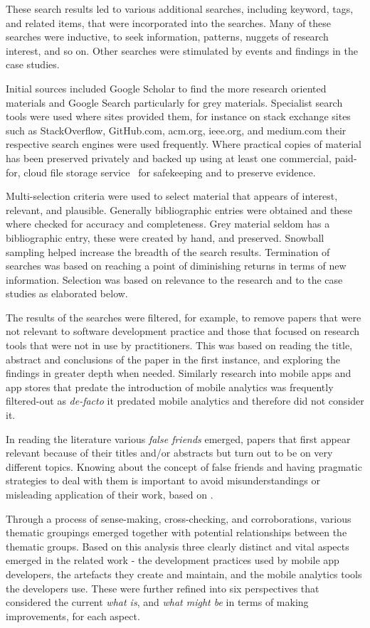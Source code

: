 These search results led to various additional searches, including keyword, tags, and related items, that were incorporated into the searches. Many of these searches were inductive, to seek information, patterns, nuggets of research interest, and so on. Other searches were stimulated by events and findings in the case studies.

Initial sources included Google Scholar to find the more research oriented materials and Google Search particularly for grey materials. Specialist search tools were used where sites provided them, for instance on stack exchange sites such as StackOverflow, GitHub.com, acm.org, ieee.org, and medium.com their respective search engines were used frequently. Where practical copies of material has been preserved privately and backed up using at least one commercial, paid-for, cloud file storage service~ for safekeeping and to preserve evidence.

Multi-selection criteria were used to select material that appears of interest, relevant, and plausible. Generally bibliographic entries were obtained and these where checked for accuracy and completeness. Grey material seldom has a bibliographic entry, these were created by hand, and preserved. Snowball sampling helped increase the breadth of the search results. Termination of searches was based on reaching a point of diminishing returns in terms of new information. Selection was based on relevance to the research and to the case studies as elaborated below.

The results of the searches were filtered, for example, to remove papers that were not relevant to software development practice and those that focused on research tools that were not in use by practitioners. This was based on reading the title, abstract and conclusions of the paper in the first instance, and exploring the findings in greater depth when needed. Similarly research into mobile apps and app stores that predate the introduction of mobile analytics was frequently filtered-out as \emph{de-facto} it predated mobile analytics and therefore did not consider it.

In reading the literature various \textit{false friends} emerged, papers that first appear relevant because of their titles and/or abstracts but turn out to be on very different topics. 
Knowing about the concept of false friends and having pragmatic strategies to deal with them is important to avoid misunderstandings or misleading application of their work, 
based on . 

Through a process of sense-making, cross-checking, and corroborations, various thematic groupings emerged together with potential relationships between the thematic groups. Based on this analysis three clearly distinct and vital aspects emerged in the related work - the development practices used by mobile app developers, the artefacts they create and maintain, and the mobile analytics tools the developers use. These were further refined into six perspectives that considered the current \emph{what is}, and \emph{what might be} in terms of making improvements, for each aspect. 

